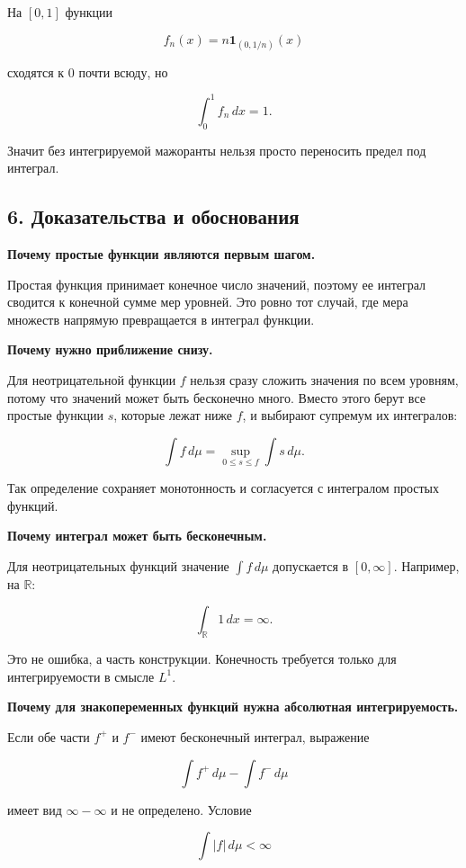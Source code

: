 \documentclass[
  11pt,
  a4paper,
]{article}
\begin{document}
На \([0,1]\) функции

\[
f_n(x)=n\mathbf 1_{(0,1/n)}(x)
\]

сходятся к \(0\) почти всюду, но

\[
\int_0^1 f_n\,dx=1.
\]

Значит без интегрируемой мажоранты нельзя просто переносить предел под
интеграл.

\subsection{6. Доказательства и
обоснования}\label{ux434ux43eux43aux430ux437ux430ux442ux435ux43bux44cux441ux442ux432ux430-ux438-ux43eux431ux43eux441ux43dux43eux432ux430ux43dux438ux44f}

\textbf{Почему простые функции являются первым шагом.}

Простая функция принимает конечное число значений, поэтому ее интеграл
сводится к конечной сумме мер уровней. Это ровно тот случай, где мера
множеств напрямую превращается в интеграл функции.

\textbf{Почему нужно приближение снизу.}

Для неотрицательной функции \(f\) нельзя сразу сложить значения по всем
уровням, потому что значений может быть бесконечно много. Вместо этого
берут все простые функции \(s\), которые лежат ниже \(f\), и выбирают
супремум их интегралов:

\[
\int f\,d\mu=\sup_{0\le s\le f}\int s\,d\mu.
\]

Так определение сохраняет монотонность и согласуется с интегралом
простых функций.

\textbf{Почему интеграл может быть бесконечным.}

Для неотрицательных функций значение \(\int f\,d\mu\) допускается в
\([0,\infty]\). Например, на \(\mathbb R\):

\[
\int_{\mathbb R}1\,dx=\infty.
\]

Это не ошибка, а часть конструкции. Конечность требуется только для
интегрируемости в смысле \(L^1\).

\textbf{Почему для знакопеременных функций нужна абсолютная
интегрируемость.}

Если обе части \(f^+\) и \(f^-\) имеют бесконечный интеграл, выражение

\[
\int f^+\,d\mu-\int f^-\,d\mu
\]

имеет вид \(\infty-\infty\) и не определено. Условие

\[
\int |f|\,d\mu<\infty
\]
\end{document}
